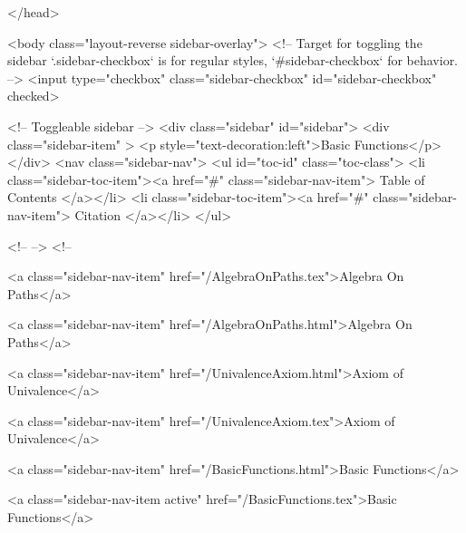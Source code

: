   
</head>




  <body class="layout-reverse sidebar-overlay">
    <!-- Target for toggling the sidebar `.sidebar-checkbox` is for regular
     styles, `#sidebar-checkbox` for behavior. -->
<input type="checkbox" class="sidebar-checkbox" id="sidebar-checkbox" checked>

<!-- Toggleable sidebar -->
<div class="sidebar" id="sidebar">
  <div class="sidebar-item" >
    <p style="text-decoration:left">Basic Functions</p>
  </div>
  <nav class="sidebar-nav">
    <ul id="toc-id" class="toc-class">
  <li class="sidebar-toc-item"><a href="#" class="sidebar-nav-item"> Table of Contents </a></li>
  <li class="sidebar-toc-item"><a href="#" class="sidebar-nav-item"> Citation </a></li>
</ul>


    <!--  -->
    <!-- 
      
    
      
    
      
    
      
        
      
    
      
        
          <a class="sidebar-nav-item" href="/AlgebraOnPaths.tex">Algebra On Paths</a>
        
      
    
      
        
          <a class="sidebar-nav-item" href="/AlgebraOnPaths.html">Algebra On Paths</a>
        
      
    
      
        
          <a class="sidebar-nav-item" href="/UnivalenceAxiom.html">Axiom of Univalence</a>
        
      
    
      
        
          <a class="sidebar-nav-item" href="/UnivalenceAxiom.tex">Axiom of Univalence</a>
        
      
    
      
        
          <a class="sidebar-nav-item" href="/BasicFunctions.html">Basic Functions</a>
        
      
    
      
        
          <a class="sidebar-nav-item active" href="/BasicFunctions.tex">Basic Functions</a>
        
      
    
